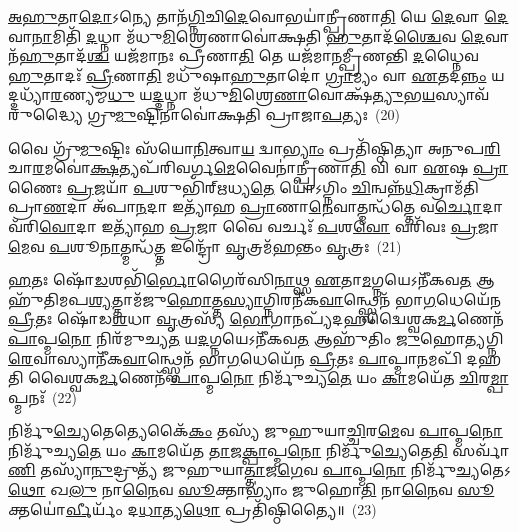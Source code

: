 \-\ul{𑌅}\-\-\ul{𑌹𑍁}\-𑌤𑌾\-\ul{𑌦𑍋}\-\-𑌽𑌨𑍍𑌯𑍇 𑌤𑌾𑌨᳴\-\ul{𑌗𑍍𑌨𑌿}\-𑌚𑌿\-\ul{𑌦𑍇}\-𑌵𑍋𑌭𑌯𑌾॑𑌨𑍍𑌪𑍍𑌰𑍀𑌣𑌾\-\ul{𑌤𑌿} 𑌯𑍇 \ul{𑌦𑍇}\-𑌵𑌾 \ul{𑌦𑍇}\-𑌵𑌾\-\ul{𑌨𑌾}\-𑌮𑌿𑌤𑌿᳴ \ul{𑌦}\-𑌧𑍍𑌨𑌾 𑌮᳴𑌧𑍁\-\ul{𑌮𑌿}\-𑌶𑍍𑌰𑍇𑌣𑌾𑌵𑍋॑𑌕𑍍𑌷𑌤𑌿 \ul{𑌹𑍁}\-𑌤𑌾𑌦᳴\-\ul{𑌶𑍍𑌚𑍈}\-𑌵 \ul{𑌦𑍇}\-𑌵𑌾𑌨᳴\-\ul{𑌹𑍁}\-𑌤𑌾𑌦᳴\-\ul{𑌶𑍍𑌚} 𑌯𑌜᳴𑌮𑌾𑌨𑌃 𑌪𑍍𑌰𑍀𑌣𑌾\-\ul{𑌤𑌿} 𑌤𑍇 𑌯𑌜᳴𑌮𑌾𑌨𑌮𑍍𑌪𑍍𑌰𑍀𑌣𑌨𑍍𑌤𑌿 \ul{𑌦}\-𑌧𑍍𑌨𑍈𑌵 \ul{𑌹𑍁}\-𑌤𑌾𑌦𑌃᳴ \ul{𑌪𑍍𑌰𑍀}\-𑌣𑌾\-\ul{𑌤𑌿} 𑌮𑌧𑍁᳴𑌷𑌾\-\ul{𑌹𑍁}\-𑌤𑌾𑌦𑍋॑ \ul{𑌗𑍍𑌰𑌾}\-𑌮𑍍𑌯𑌂 𑌵𑌾 \ul{𑌏}\-𑌤𑌦\-\ul{𑌨𑍍𑌨𑌂} 𑌯𑌦𑍍𑌦𑌧𑍍𑌯𑌾᳴\-\ul{𑌰}\-𑌣𑍍𑌯𑌮𑍍𑌮\-\ul{𑌧𑍁} 𑌯\-\ul{𑌦𑍍𑌦}\-𑌧𑍍𑌨𑌾 𑌮᳴𑌧𑍁\-\ul{𑌮𑌿}\-𑌶𑍍𑌰𑍇\-\ul{𑌣𑌾}\-𑌵𑍋𑌕𑍍𑌷᳴\-\ul{𑌤𑍍𑌯𑍁}\-𑌭\-\ul{𑌯}\-𑌸𑍍𑌯𑌾𑌵᳴𑌰𑍁𑌦𑍍𑌧𑍍𑌯𑍈 𑌗𑍍𑌰𑍁\-\ul{𑌮𑍁}\-𑌷𑍍𑌟𑌿𑌨𑌾𑌵𑍋॑𑌕𑍍𑌷𑌤𑌿 𑌪𑍍𑌰𑌾𑌜𑌾\-\ul{𑌪}\-𑌤𑍍𑌯𑌃~(20)

𑌵𑍈 𑌗𑍍𑌰𑍁᳴\-\ul{𑌮𑍁}\-𑌷𑍍𑌟𑌿𑌃 𑌸᳴𑌯𑍋\-\ul{𑌨𑌿}\-𑌤𑍍𑌵𑌾\-\ul{𑌯} 𑌦𑍍𑌵𑌾\-\ul{𑌭𑍍𑌯𑌾𑌂} 𑌪𑍍𑌰𑌤𑌿᳴𑌷𑍍𑌠𑌿𑌤𑍍𑌯𑌾 𑌅𑌨𑍁𑌪\-\ul{𑌰𑌿}\-𑌚𑌾\-\ul{𑌰}\-𑌮𑌵𑍋॑\-\ul{𑌕𑍍𑌷}\-𑌤𑍍𑌯𑌪᳴𑌰𑌿𑌵𑌰𑍍𑌗\-\ul{𑌮𑍇}\-𑌵𑍈𑌨𑌾॑𑌨𑍍𑌪𑍍𑌰𑍀𑌣𑌾\-\ul{𑌤𑌿} 𑌵𑌿 𑌵𑌾 \ul{𑌏}\-𑌷 \ul{𑌪𑍍𑌰𑌾}\-𑌣𑍈𑌃 \ul{𑌪𑍍𑌰}\-𑌜𑌯𑌾᳴ \ul{𑌪}\-𑌶𑍁𑌭𑌿᳴𑌰𑍍\mbox{}𑌋𑌧𑍍𑌯\-\ul{𑌤𑍇} 𑌯𑍋॑\-𑌽𑌗𑍍𑌨𑌿𑌂 \ul{𑌚𑌿}\-𑌨𑍍𑌵𑌨𑍍𑌨᳴\-\ul{𑌧𑌿}\-𑌕𑍍𑌰𑌾𑌮᳴𑌤𑌿 𑌪𑍍𑌰𑌾\-\ul{𑌣}\-𑌦𑌾 𑌅᳴𑌪𑌾\-\ul{𑌨}\-𑌦𑌾 𑌇𑌤𑍍𑌯𑌾᳴𑌹 \ul{𑌪𑍍𑌰𑌾}\-𑌣𑌾\-\ul{𑌨𑍇}\-𑌵𑌾𑌤𑍍𑌮𑌨𑍍𑌧᳴𑌤𑍍𑌤𑍇 𑌵\-\ul{𑌰𑍍𑌚𑍋}\-𑌦𑌾 𑌵᳴𑌰𑌿\-\ul{𑌵𑍋}\-𑌦𑌾 𑌇𑌤𑍍𑌯𑌾᳴𑌹 \ul{𑌪𑍍𑌰}\-𑌜𑌾 𑌵𑍈 𑌵𑌰𑍍𑌚𑌃᳴ \ul{𑌪}\-𑌶\-\ul{𑌵𑍋} 𑌵𑌰𑌿᳴𑌵𑌃 \ul{𑌪𑍍𑌰}\-𑌜𑌾\-\ul{𑌮𑍇}\-𑌵 \ul{𑌪}\-𑌶𑍂\-\ul{𑌨𑌾}\-𑌤𑍍𑌮𑌨𑍍𑌧᳴\-\ul{𑌤𑍍𑌤} 𑌇𑌨𑍍𑌦𑍍𑌰𑍋᳴ \ul{𑌵𑍃}\-𑌤𑍍𑌰𑌮᳴\-\ul{𑌹}\-𑌨𑍍𑌤𑌂 \ul{𑌵𑍃}\-𑌤𑍍𑌰𑌃~(21)

\-\ul{𑌹}\-𑌤𑌃 𑌷𑍋᳴\-\ul{𑌡}\-𑌶𑌭𑌿᳴\-\ul{𑌰𑍍𑌭𑍋}\-𑌗𑍈𑌰᳴𑌸𑌿\-\ul{𑌨𑌾}\-𑌥𑍍𑌸 \ul{𑌏}\-𑌤𑌾\-\ul{𑌮}\-𑌗𑍍𑌨𑌯𑍇\-𑌽𑌨𑍀᳴𑌕𑌵\-\ul{𑌤} 𑌆𑌹𑍁᳴𑌤𑌿𑌮𑌪\-\ul{𑌶𑍍𑌯}\-𑌤𑍍𑌤𑌾𑌮᳴𑌜𑍁\-\ul{𑌹𑍋}\-𑌤𑍍𑌤\-\ul{𑌸𑍍𑌯𑌾}\-𑌗𑍍𑌨𑌿𑌰𑌨𑍀᳴𑌕\-\ul{𑌵𑌾}\-𑌨𑍍𑌥𑍍𑌸𑍍𑌵𑍇𑌨᳴ 𑌭𑌾\-\ul{𑌗}\-𑌧𑍇𑌯𑍇᳴𑌨 \ul{𑌪𑍍𑌰𑍀}\-𑌤𑌃 𑌷𑍋᳴𑌡\-\ul{𑌶}\-𑌧𑌾 \ul{𑌵𑍃}\-𑌤𑍍𑌰𑌸𑍍𑌯᳴ \ul{𑌭𑍋}\-𑌗𑌾𑌨𑌪𑍍𑌯᳴𑌦𑌹𑌦𑍍𑌵𑍈𑌶𑍍𑌵𑌕\-\ul{𑌰𑍍𑌮}\-𑌣𑍇𑌨᳴ \ul{𑌪𑌾}\-𑌪𑍍𑌮\-\ul{𑌨𑍋} 𑌨𑌿𑌰᳴𑌮𑍁𑌚𑍍𑌯\-\ul{𑌤} 𑌯\-\ul{𑌦}\-𑌗𑍍𑌨𑌯𑍇\-𑌽𑌨𑍀᳴𑌕𑌵\-\ul{𑌤} 𑌆𑌹𑍁᳴𑌤𑌿𑌂 \ul{𑌜𑍁}\-𑌹𑍋\-\ul{𑌤𑍍𑌯}\-𑌗𑍍𑌨𑌿\-\ul{𑌰𑍇}\-𑌵𑌾𑌸𑍍𑌯𑌾𑌨𑍀᳴𑌕\-\ul{𑌵𑌾}\-𑌨𑍍𑌥𑍍𑌸𑍍𑌵𑍇𑌨᳴ 𑌭𑌾\-\ul{𑌗}\-𑌧𑍇𑌯𑍇᳴𑌨 \ul{𑌪𑍍𑌰𑍀}\-𑌤𑌃 \ul{𑌪𑌾}\-𑌪𑍍𑌮𑌾\-\ul{𑌨}\-𑌮𑌪𑌿᳴ 𑌦𑌹𑌤𑌿 𑌵𑍈𑌶𑍍𑌵𑌕\-\ul{𑌰𑍍𑌮}\-𑌣𑍇𑌨᳴ \ul{𑌪𑌾}\-𑌪𑍍𑌮\-\ul{𑌨𑍋} 𑌨𑌿𑌰𑍍𑌮𑍁᳴𑌚𑍍𑌯\-\ul{𑌤𑍇} 𑌯𑌂 \ul{𑌕𑌾}\-𑌮𑌯𑍇᳴𑌤 \ul{𑌚𑌿}\-𑌰\-\ul{𑌮𑍍𑌪𑌾}\-𑌪𑍍𑌮𑌨𑌃᳴~(22)

𑌨𑌿𑌰𑍍𑌮𑍁᳴\-\ul{𑌚𑍍𑌯𑍇}\-𑌤𑍇𑌤𑍍𑌯𑍇𑌕𑍈᳴\-\ul{𑌕𑌂} 𑌤𑌸𑍍𑌯᳴ 𑌜𑍁𑌹𑍁𑌯𑌾\-\ul{𑌚𑍍𑌚𑌿}\-𑌰\-\ul{𑌮𑍇}\-𑌵 \ul{𑌪𑌾}\-𑌪𑍍𑌮\-\ul{𑌨𑍋} 𑌨𑌿𑌰𑍍𑌮𑍁᳴𑌚𑍍𑌯\-\ul{𑌤𑍇} 𑌯𑌂 \ul{𑌕𑌾}\-𑌮𑌯𑍇᳴𑌤 \ul{𑌤𑌾}\-𑌜\-\ul{𑌕𑍍𑌪𑌾}\-𑌪𑍍𑌮\-\ul{𑌨𑍋} 𑌨𑌿𑌰𑍍𑌮𑍁᳴\-\ul{𑌚𑍍𑌯𑍇}\-𑌤𑍇\-\ul{𑌤𑌿} 𑌸𑌰𑍍𑌵𑌾᳴\-\ul{𑌣𑌿} 𑌤𑌸𑍍𑌯𑌾᳴\-\ul{𑌨𑍁}\-𑌦𑍍𑌰𑍁𑌤𑍍𑌯᳴ 𑌜𑍁𑌹𑍁𑌯𑌾\-\ul{𑌤𑍍𑌤𑌾}\-𑌜\-\ul{𑌗𑍇}\-𑌵 \ul{𑌪𑌾}\-𑌪𑍍𑌮\-\ul{𑌨𑍋} 𑌨𑌿𑌰𑍍𑌮𑍁᳴\-\ul{𑌚𑍍𑌯}\-𑌤𑍇\-𑌽\-\ul{𑌥𑍋} 𑌖\-\ul{𑌲𑍁} 𑌨𑌾\-\ul{𑌨𑍈}\-𑌵 \ul{𑌸𑍂}\-𑌕𑍍𑌤𑌾\-𑌭𑍍𑌯𑌾𑌂॑ 𑌜𑍁𑌹𑍋\-\ul{𑌤𑌿} 𑌨𑌾\-\ul{𑌨𑍈}\-𑌵 \ul{𑌸𑍂}\-𑌕𑍍𑌤𑌯𑍋॑\-\ul{𑌰𑍍𑌵𑍀}\-𑌰𑍍𑌯𑌂᳴ 𑌦\-\ul{𑌧𑌾}\-𑌤𑍍𑌯\-\ul{𑌥𑍋} 𑌪𑍍𑌰𑌤𑌿᳴𑌷𑍍𑌠𑌿𑌤𑍍𑌯𑍈॥~(23)

{\anuvakamend[{\-\ul{𑌦𑍇}\-𑌵𑌾𑌃 𑌪𑍍𑌰𑌾᳴𑌜𑌾\-\ul{𑌪}\-𑌤𑍍𑌯𑍋 \ul{𑌵𑍃}\-𑌤𑍍𑌰\-\ul{𑌶𑍍𑌚𑌿}\-𑌰𑌂 \ul{𑌪𑌾}\-𑌪𑍍𑌮𑌨᳴𑌶𑍍𑌚𑌤𑍍𑌵𑌾\-\ul{𑌰𑌿}\-\-\ul{𑍞}\-𑌶𑌚𑍍𑌚᳴}]}%

